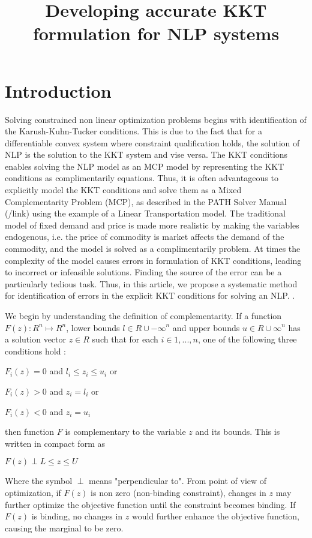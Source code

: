 \documentclass{article}
\title{Developing accurate KKT formulation for NLP systems}
\begin{document}
\section{Introduction}
Solving constrained non linear optimization problems begins with identification of the Karush-Kuhn-Tucker conditions. This is due to the fact that for a differentiable convex system where constraint qualification holds, the solution of NLP is the solution to the KKT system and vise versa. The KKT conditions enables solving the NLP model as an MCP model by representing the KKT conditions as complimentarily equations.  Thus, it is often advantageous to explicitly model the KKT conditions and solve them as a Mixed Complementarity Problem (MCP), as described in the PATH Solver Manual (/link) using the example of a Linear Transportation model. The traditional model of fixed demand and price is made more realistic by making the variables endogenous, i.e. the price of commodity is market affects the demand of the commodity, and the model is solved as a complimentarily problem.  At times the complexity of the model causes errors in formulation of KKT conditions, leading to incorrect or infeasible solutions. Finding the source of the error can be a particularly tedious task. Thus, in this article, we propose a systematic method for identification of errors in the explicit KKT conditions for solving an NLP. .

We begin by understanding the definition of complementarity. If a function $F(z) : {\!R}^n \mapsto {\!R}^n$, lower bounds $ l \in { \!R \cup {-\infty}}^n$ and upper bounds $ u \in { \!R \cup {\infty}}^n$ has a solution vector $z \in \!R$ such that for each $ i \in {1,...,n}$, one of the following three conditions hold :

 \centerline{$F_{i}(z) = 0$  and  $ l_i \leq z_i \leq u_i $   or}
 \centerline{$F_{i}(z) > 0$  and  $ z_i = l_i$  or }
 \centerline{ $F_{i}(z) < 0$  and  $ z_i = u_i$ }

then function $F$ is complementary to the variable $z$ and its bounds. This is written in compact form as

\centerline{ $ F(z) \perp L \leq z \leq U $ }
\par
\noindent Where the symbol $\perp$ means "perpendicular to".  From point of view of optimization, if $F(z)$ is non zero (non-binding constraint), changes in $z$ may further optimize the objective function until the constraint becomes binding. If $F(z)$ is binding, no changes in $z$ would further enhance the objective function, causing the marginal to be zero.
\end{document}
